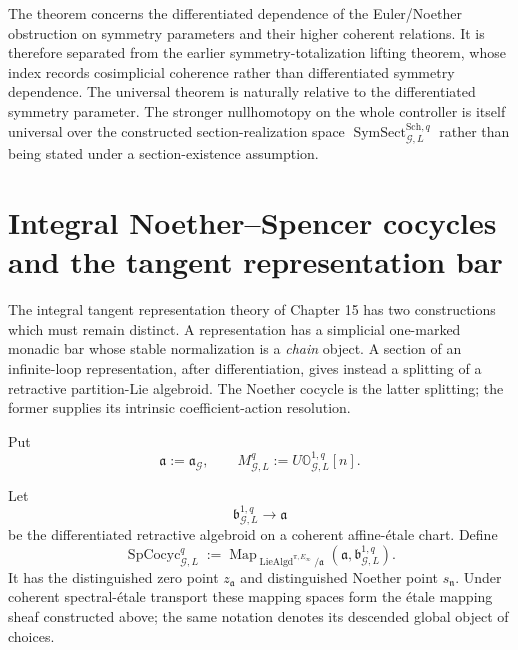 \begin{remark}
\label{rem:symmetry-noether-why-this-theorem-carries-the-second-noether-name}
The theorem concerns the differentiated dependence of the Euler/Noether
obstruction on symmetry parameters and their higher coherent relations.  It is
therefore separated from the earlier symmetry-totalization lifting theorem, whose
index records cosimplicial coherence rather than differentiated symmetry dependence.
The universal theorem is naturally relative to the differentiated symmetry
parameter.  The stronger nullhomotopy on the whole controller is itself universal
over the constructed section-realization space
$\operatorname{SymSect}_{\mathcal G,L}^{\mathrm{Sch},q}$ rather than being stated
under a section-existence assumption.
\end{remark}

\section{Integral Noether--Spencer cocycles and the tangent representation bar}
\label{sec:symmetry-noether-integral-noether-spencer-cocycles-and-the-tangent-representation-bar}

The integral tangent representation theory of Chapter 15 has two constructions
which must remain distinct.  A representation has a simplicial one-marked monadic
bar whose stable normalization is a \emph{chain} object.  A section of an
infinite-loop representation, after differentiation, gives instead a splitting of
a retractive partition-Lie algebroid.  The Noether cocycle is the latter splitting;
the former supplies its intrinsic coefficient-action resolution.

Put
\[
\mathfrak a:=\mathfrak a_{\mathcal G},
\qquad
M_{\mathcal G,L}^{q}:=
U\mathbb O_{\mathcal G,L}^{1,q}[n].
\]

\begin{definition}
\label{def:symmetry-noether-integral-noether-spencer-cocycle-space}
Let
\[
\mathfrak b_{\mathcal G,L}^{1,q}\longrightarrow\mathfrak a
\]
be the differentiated retractive algebroid on a coherent affine-\'etale chart.
Define
\[
\boxed{
\operatorname{SpCocyc}_{\mathcal G,L}^{q}
:=
\operatorname{Map}_{\operatorname{LieAlgd}^{\pi,E_\infty}/\mathfrak a}
\left(
\mathfrak a,
\mathfrak b_{\mathcal G,L}^{1,q}
\right).
}
\]
It has the distinguished zero point $z_{\mathfrak a}$ and distinguished Noether
point $s_{\mathfrak n}$.  Under coherent spectral-\'etale transport these mapping
spaces form the \'etale mapping sheaf constructed above; the same notation denotes
its descended global object of choices.
\end{definition}

